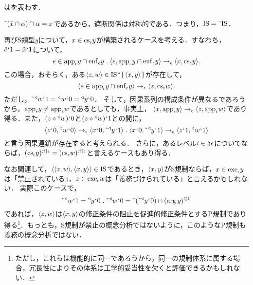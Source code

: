 \begin{df}
\label{df:遮断関係}
はを表わす．
\end{df}

\noindent $ \bar{\:\:}(\bar{x}\cap\alpha)\cap\alpha = x $であるから，遮断関係は対称的である．つまり，$ \mathrm{IS}=\breve{\:\:}\mathrm{IS} $．

再びS類型$y$について，$ x\in\mathrm{cs}_{\epsilon}y $が構築されるケースを考える．すなわち，$ \tilde{e}{\mspace{1mu}{`}\mspace{1mu}} 1 = \tilde{x}{\mspace{1mu}{`}\mspace{1mu}} 1 $について，
\[
    e\in\app{\epsilon} y\cap\enf{\epsilon}y\con{1}
    \orp{e,\app{\epsilon} y\cap\enf{\epsilon}y}\to_{\epsilon}\orp{x,\cs{\epsilon}y}.
\]
この場合，おそらく，ある$ \langle z,w \rangle\in\mathrm{IS}{\mspace{1mu}{``}\mspace{1mu}}\{\mspace{2mu}\langle x,y \rangle\mspace{2mu}\} $が存在して，
\[
    \langle e\in\mathrm{app}_{\epsilon} y\cap\mathrm{enf}_{\epsilon}y \rangle\to_{\epsilon}\langle z,\mathrm{cs}_{\epsilon}w \rangle.
\]
ただし，$ \tilde{\:\:}{^\triangleleft}w{\mspace{1mu}{`}\mspace{1mu}} 1 = {^\triangleleft}w{\mspace{1mu}{`}\mspace{1mu}} 0 = {^\triangleleft}y{\mspace{1mu}{`}\mspace{1mu}} 0 $．
そして，因果系列の構成条件が異なるであろうから，$ \mathrm{app}_{\epsilon} y \neq \mathrm{app}_{\epsilon} w $であるとしても，事実上，
$ \langle x,\mathrm{app}_{\epsilon} y \rangle\to_{\epsilon}\langle z,\mathrm{app}_{\epsilon} w \rangle $であり得る．また，$ (z\diamond{^\triangleleft}w){\mspace{1mu}{`}\mspace{1mu}} 0 $と$ (z\diamond{^\triangleleft}w){\mspace{1mu}{`}\mspace{1mu}} 1 $との間に，
\[
   \orp{z\fap 0,\trgl{w}\fap 0}\to_{\epsilon}\orp{x\fap 0,\tildel{\trgl{y}}\fap 1}\con{1}
    \orp{x\fap 0,\tildel{\trgl{y}}\fap 1}\to_{\epsilon}\orp{z\fap 1,\trgl{w}\fap 1}
\]
と言う因果連鎖が存在すると考えられる．
さらに，あるレベル$ i\in\mathfrak{h}\epsilon $についてならば，$ (\mathrm{cs}_{\epsilon}y)^{:i\mathbin{\upharpoonleft}\epsilon} = (\mathrm{cs}_{\epsilon}w)^{:i\mathbin{\upharpoonleft}\epsilon} $と言えるケースもあり得る．

なお関連して，$ \langle \langle z,w \rangle,\langle x,y \rangle \rangle\in\mathrm{IS} $であるとき，$ \langle x,y \rangle $がS規制ならば，$ x\in\mathrm{exe}_{\epsilon} y $は「禁止されている」，$ z\in\mathrm{exe}_{\epsilon} w $は「義務づけられている」と言えるかもしれない．
実際このケースで，
\[
    \tildel{\trgl{w}}\fap 1 = \trgl{y}\fap 0\con{1}
    \tildel{\trgl{w}}\fap 0 = \barl{(\tildel{\trgl{y}}\fap 0)}\cap\mser{(\arg y)}{0}
\]
であれば，$ \langle z,w \rangle $は$ \langle x,y \rangle $の修正条件の阻止を促進的修正条件とするP規制であり得る\footnote{
    ただし，これらは機能的に同一であろうから，同一の規制体系に属する場合，冗長性によりその体系は工学的妥当性を欠くと評価できるかもしれない．
}．もっとも，S規制が禁止の概念分析ではないように，このようなP規制も義務の概念分析ではない．

